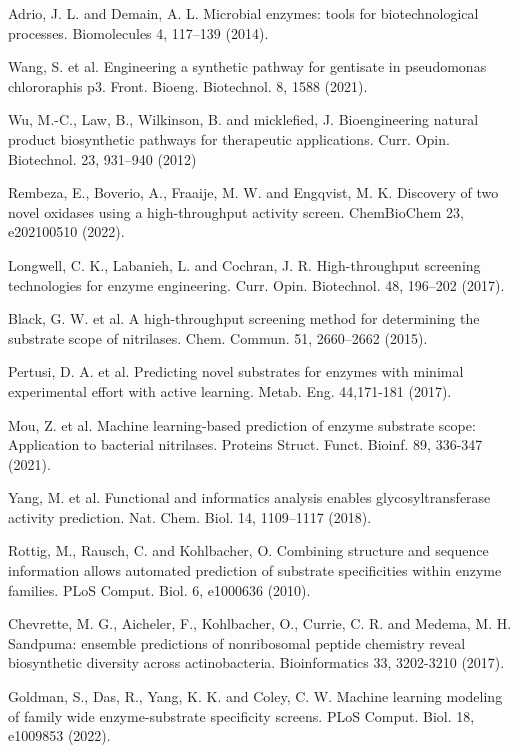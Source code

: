 \documentclass[12pt]{article}
\begin{document}
\begin{thebibliography}{99}
 Adrio, J. L. and Demain, A. L. Microbial enzymes: tools for biotechnological processes. Biomolecules 4, 117–139 (2014).

 Wang, S. et al. Engineering a synthetic pathway for gentisate in pseudomonas chlororaphis p3. Front. Bioeng. Biotechnol. 8, 1588 (2021).

 Wu, M.-C., Law, B., Wilkinson, B. and micklefied, J. Bioengineering natural product biosynthetic pathways for therapeutic applications. Curr. Opin. Biotechnol. 23, 931–940 (2012)


 Rembeza, E., Boverio, A., Fraaije, M. W. and Engqvist, M. K. Discovery of two novel oxidases using a high-throughput activity screen. ChemBioChem 23, e202100510 (2022).

 Longwell, C. K., Labanieh, L. and Cochran, J. R. High-throughput screening technologies for enzyme engineering. Curr. Opin. Biotechnol. 48, 196–202 (2017).

 Black, G. W. et al. A high-throughput screening method for determining the substrate scope of nitrilases. Chem. Commun. 51, 2660–2662 (2015).

 Pertusi, D. A. et al. Predicting novel substrates for enzymes with minimal experimental effort with active learning. Metab. Eng. 44,171-181 (2017).

 Mou, Z. et al. Machine learning-based prediction of enzyme substrate scope: Application to bacterial nitrilases. Proteins Struct. Funct. Bioinf. 89, 336-347 (2021).

 Yang, M. et al. Functional and informatics analysis enables glycosyltransferase activity prediction. Nat. Chem. Biol. 14, 1109–1117 (2018).

 Rottig, M., Rausch, C. and Kohlbacher, O. Combining structure and sequence information allows automated prediction of substrate specificities within enzyme families. PLoS Comput. Biol. 6, e1000636 (2010).

 Chevrette, M. G., Aicheler, F., Kohlbacher, O., Currie, C. R. and Medema, M. H. Sandpuma: ensemble predictions of nonribosomal peptide chemistry reveal biosynthetic diversity across actinobacteria. Bioinformatics 33, 3202-3210 (2017).

 Goldman, S., Das, R., Yang, K. K. and Coley, C. W. Machine learning modeling of family wide enzyme-substrate specificity screens. PLoS Comput. Biol. 18, e1009853 (2022).


\end{thebibliography}
\end{document}
